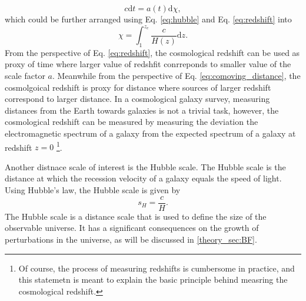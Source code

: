 \begin{equation}
    c\mathrm{d}t = a(t)\mathrm{d}\chi,
\end{equation}
which could be further arranged using Eq. \ref{eq:hubble} and Eq. \ref{eq:redshift} into
\begin{equation} \label{eq:comoving_distance}
    \chi = \int_{1}^{z_e} \frac{c}{H(z)} \mathrm{d}z.
\end{equation}
From the perspective of Eq. \ref{eq:redshift}, the cosmological redshift can be used as proxy of time where larger value of redshfit conrreponds to smaller value of the scale factor $a$. Meanwhile from the perspective of Eq. \ref{eq:comoving_distance}, the cosmolgoical redshift is proxy for distance where sources of larger redshift correspond to larger distance. In a cosmological galaxy survey, measuring distances from the Earth towards galaxies is not a trivial task, however, the cosmological redshift can be measured by measuring the deviation the electromagnetic spectrum of a galaxy from the expected spectrum of a galaxy at redshift $z = 0$ \footnote{Of course, the process of measuring redshifts is cumbersome in practice, and this statemetn is meant to explain the basic principle behind measring the cosmological redshift.}. 

Another distnace scale of interest is the Hubble scale. The Hubble scale is the distance at which the recession velocity of a galaxy equals the speed of light. Using Hubble's law, the Hubble scale is given by
\begin{equation}\label{eq:hubble_scale}
    s_H = \frac{c}{H}.
\end{equation}
The Hubble scale is a distance scale that is used to define the size of the observable universe. It has a significant consequences on the growth of perturbations in the universe, as will be discussed in \ref{theory_sec:BF}.


